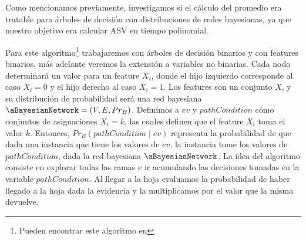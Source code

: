 Como mencionamos previamente, investigamos si el cálculo del promedio era tratable para árboles de decisión con distribuciones de redes bayesianas, ya que nuestro objetivo era calcular ASV en tiempo polinomial. %



Para este algoritmo\footnote{Pueden encontrar este algoritmo en } trabajaremos con árboles de decisión binarios y con features binarios, más adelante veremos la extensión a variables no binarias. Cada nodo determinará un valor para un feature $X_i$, donde el hijo izquierdo corresponde al caso $X_i=0$ y el hijo derecho al caso $X_i=1$. Los features son un conjunto $X$, y su distribución de probabilidad será una red bayesiana $\aBayesianNetwork = (V, E, Pr_B)$. Definimos a $ev$ y $pathCondition$ cómo conjuntos de asignaciones $X_i = k$, las cuales definen que el feature $X_i$ toma el valor $k$. Entonces, $Pr_B(pathCondition \mid ev)$ representa la probabilidad de que dada una instancia que tiene los valores de $ev$, la instancia tome los valores de $pathCondition$, dada la red bayesiana $\aBayesianNetwork$. La idea del algoritmo consiste en explorar todas las ramas e ir acumulando las decisiones tomadas en la variable $pathCondition$. Al llegar a la hoja evaluamos la probabilidad de haber llegado a la hoja dada la evidencia y la multiplicamos por el valor que la misma devuelve. 






